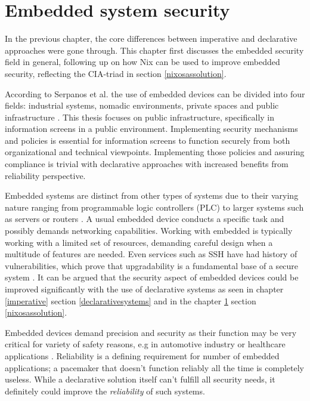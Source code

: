 \chapter{Embedded system security} \label{embedded}

In the previous chapter, the core differences between imperative and
declarative approaches were gone through. This chapter first discusses
the embedded security field in general, following up on how Nix can be
used to improve embedded security, reflecting the CIA-triad in section
\ref{nixosassolution}.

According to Serpanos et al. the use of embedded devices can be
divided into four fields: industrial systems, nomadic environments,
private spaces and public infrastructure
\cite{serpanos2013security}. This thesis focuses on public
infrastructure, specifically in information screens in a public
environment. Implementing security mechanisms and policies is
essential for information screens to function securely from both
organizational and technical viewpoints. Implementing those policies
and assuring compliance is trivial with declarative approaches with
increased benefits from reliability perspective.

Embedded systems are distinct from other types of systems due to their
varying nature ranging from programmable logic controllers (PLC) to
larger systems such as servers or
routers \cite{fysarakis2014embedded}. A usual embedded device
conducts a specific task and possibly demands networking
capabilities. Working with embedded is typically working with a
limited set of resources, demanding careful design when a multitude of
features are needed. Even services such as SSH have
had history of vulnerabilities, which prove that upgradability is a
fundamental base of a secure system
\cite{secopsolutionHistorySecOps}. It can be argued that the security aspect of
embedded devices could be improved significantly with the use of
declarative systems as seen in chapter \ref{imperative} section
\ref{declarativesystems} and in the chapter \ref{embedded} section
\ref{nixosassolution}.

Embedded devices demand precision and security as their function may
be very critical for variety of safety reasons, e.g in automotive
industry or healthcare applications \cite{turab2019secure,
  fysarakis2014embedded}. Reliability is a defining requirement for
number of embedded applications; a pacemaker that doesn't function reliably all
the time is completely useless. While a declarative solution
itself can't fulfill all security needs, it definitely could improve
the \textit{reliability} of such systems.

